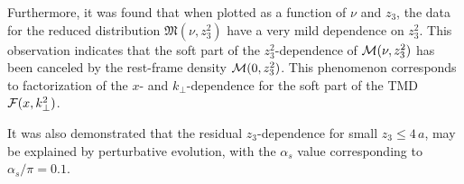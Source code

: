 Furthermore, it was found that when plotted as a function of $\nu$ and $z_3$,
the data for the reduced distribution ${\mathfrak M} (\nu, z_3^2)$ have a very mild dependence
on $z_3^2$. This observation indicates that
the soft part of the \mbox{$z_3^2$-dependence} of ${\cal M} (\nu, z_3^2)$
has been canceled by the rest-frame density ${\cal M} (0, z_3^2)$.
This phenomenon corresponds to factorization of the $x$- and $k_\perp$-dependence
for the soft part of the TMD ${\cal F} (x, k_\perp^2)$.

It was also demonstrated that the residual \mbox{$z_3$-dependence}
for small $z_3 \leq 4 \,a$,
may be explained by perturbative evolution, with the $\alpha_s$ value
corresponding to $\alpha_s/\pi =0.1$.
